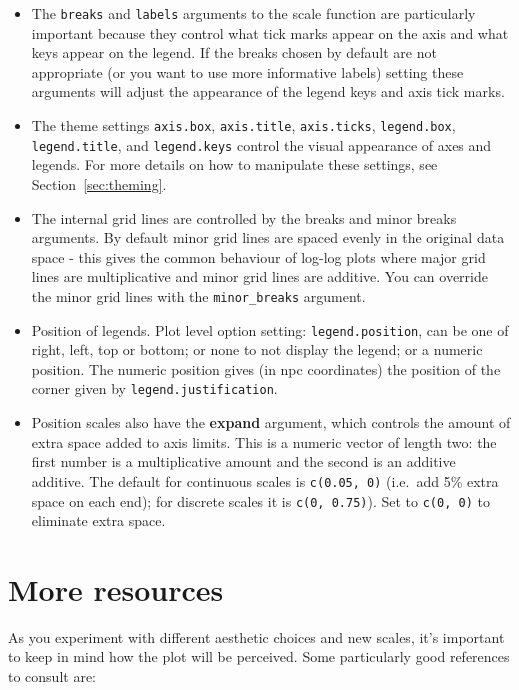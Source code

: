 \begin{itemize}
  \item The {\tt breaks} and {\tt labels} arguments to the scale function are particularly important because they control what tick marks appear on the axis and what keys appear on the legend.  If the breaks chosen by default are not appropriate (or you want to use more informative labels) setting these arguments will adjust the appearance of the legend keys and axis tick marks.  
  
  \item The theme settings {\tt axis.box}, {\tt axis.title}, {\tt axis.ticks}, {\tt legend.box}, {\tt legend.title}, and {\tt legend.keys} control the visual appearance of axes and legends.  For more details on how to manipulate these settings, see Section~\ref{sec:theming}.

  \item The internal grid lines are controlled by the breaks and minor breaks arguments.  By default minor grid lines are spaced evenly in the original data space - this gives the common behaviour of log-log plots where major grid lines are multiplicative and minor grid lines are additive.  You can override the minor grid lines with the {\tt minor\_breaks} argument.
  
  \item Position of legends.  Plot level option setting: {\tt legend.position}, can be one of right, left, top or bottom; or none to not display the legend; or a numeric position.  The numeric position gives (in npc  coordinates) the position of the corner given by {\tt legend.justification}.  
  
  \item Position scales also have the {\bf expand} argument, which controls the amount of extra space added to axis limits.  This is a numeric vector of length two: the first number is a multiplicative amount and the second is an additive additive.  The default for continuous scales is {\tt c(0.05, 0)} (i.e.\ add 5\% extra space on each end); for discrete scales it is {\tt c(0, 0.75)}).  Set to {\tt c(0, 0)} to eliminate extra space.
  
\end{itemize}

\section{More resources}
\label{sec:scale_resources}

As you experiment with different aesthetic choices and new scales, it's important to keep in mind how the plot will be perceived.   Some particularly good references to consult are:

